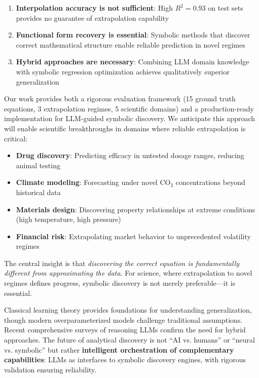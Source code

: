 \documentclass[twoside,11pt]{article}
\begin{document}
\begin{enumerate}
\item \textbf{Interpolation accuracy is not sufficient}: High $R^2 = 0.93$ on test sets provides no guarantee of extrapolation capability
\item \textbf{Functional form recovery is essential}: Symbolic methods that discover correct mathematical structure enable reliable prediction in novel regimes
\item \textbf{Hybrid approaches are necessary}: Combining LLM domain knowledge with symbolic regression optimization achieves qualitatively superior generalization
\end{enumerate}

Our work provides both a rigorous evaluation framework (15 ground truth equations, 3 extrapolation regimes, 5 scientific domains) and a production-ready implementation for LLM-guided symbolic discovery. We anticipate this approach will enable scientific breakthroughs in domains where reliable extrapolation is critical:

\begin{itemize}
\item \textbf{Drug discovery}: Predicting efficacy in untested dosage ranges, reducing animal testing
\item \textbf{Climate modeling}: Forecasting under novel CO$_2$ concentrations beyond historical data
\item \textbf{Materials design}: Discovering property relationships at extreme conditions (high temperature, high pressure)
\item \textbf{Financial risk}: Extrapolating market behavior to unprecedented volatility regimes
\end{itemize}

The central insight is that \emph{discovering the correct equation is fundamentally different from approximating the data}. For science, where extrapolation to novel regimes defines progress, symbolic discovery is not merely preferable---it is essential.

Classical learning theory \citep{vapnik1999overview,bishop2006pattern,goodfellow2016deep} provides foundations for understanding generalization, though modern overparameterized models challenge traditional assumptions. Recent comprehensive surveys \citep{zhang2025survey} of reasoning LLMs confirm the need for hybrid approaches. The future of analytical discovery is not ``AI vs. humans'' or ``neural vs. symbolic'' but rather \textbf{intelligent orchestration of complementary capabilities}: LLMs as interfaces to symbolic discovery engines, with rigorous validation ensuring reliability.
\end{document}
